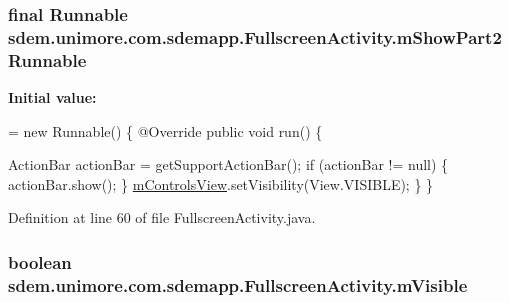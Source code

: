 \hypertarget{classsdem_1_1unimore_1_1com_1_1sdemapp_1_1_fullscreen_activity_aca929d5b4bff4f4a52c843e94ea54433}{
\subsubsection[{m\+Show\+Part2\+Runnable}]{\setlength{\rightskip}{0pt plus 5cm}final Runnable sdem.\+unimore.\+com.\+sdemapp.\+Fullscreen\+Activity.\+m\+Show\+Part2\+Runnable\hspace{0.3cm}{\ttfamily [private]}}}\label{classsdem_1_1unimore_1_1com_1_1sdemapp_1_1_fullscreen_activity_aca929d5b4bff4f4a52c843e94ea54433}
{\bfseries Initial value\+:}
\begin{DoxyCode}
= \textcolor{keyword}{new} Runnable() \{
        @Override
        \textcolor{keyword}{public} \textcolor{keywordtype}{void} run() \{
            
            ActionBar actionBar = getSupportActionBar();
            \textcolor{keywordflow}{if} (actionBar != null) \{
                actionBar.show();
            \}
            \hyperlink{classsdem_1_1unimore_1_1com_1_1sdemapp_1_1_fullscreen_activity_a6ee2fd73847cb62532e245338c584285}{mControlsView}.setVisibility(View.VISIBLE);
        \}
    \}
\end{DoxyCode}


Definition at line 60 of file Fullscreen\+Activity.\+java.

\hypertarget{classsdem_1_1unimore_1_1com_1_1sdemapp_1_1_fullscreen_activity_ae802b628029f2684f3f26db19a4cf784}{
\subsubsection[{m\+Visible}]{\setlength{\rightskip}{0pt plus 5cm}boolean sdem.\+unimore.\+com.\+sdemapp.\+Fullscreen\+Activity.\+m\+Visible\hspace{0.3cm}{\ttfamily [private]}}}\label{classsdem_1_1unimore_1_1com_1_1sdemapp_1_1_fullscreen_activity_ae802b628029f2684f3f26db19a4cf784}


